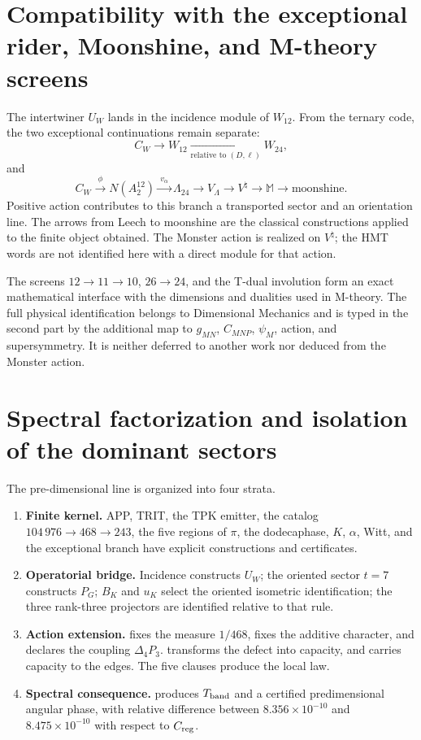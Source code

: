 \section{Compatibility with the exceptional rider, Moonshine, and M-theory screens}

The intertwiner \(U_W\) lands in the incidence module of \(W_{12}\).
From the ternary code, the two exceptional continuations remain
separate:
\[
 C_W\longrightarrow W_{12}
 \xrightarrow[\text{relative to }(D,\ell)]{}W_{24},
\]
and
\[
 C_W\xrightarrow{\ \phi\ } N(A_2^{12})
\xrightarrow{\ v_\alpha\ }\Lambda_{24}
\longrightarrow V_\Lambda
\longrightarrow V^\natural
\longrightarrow\mathbb M
\longrightarrow\text{moonshine}.
\]
Positive action contributes to this branch a transported sector and an
orientation line. The arrows from Leech to moonshine are the classical
constructions applied to the finite object obtained. The Monster action is
realized on \(V^\natural\); the HMT words are not identified here with a
direct module for that action.

The screens \(12\to11\to10\), \(26\to24\), and the T-dual involution form
an exact mathematical interface with the dimensions and dualities used in
M-theory. The full physical identification belongs to Dimensional Mechanics
and is typed in the second part by the additional map to
\(g_{MN}\), \(C_{MNP}\), \(\psi_M\), action, and supersymmetry. It is neither
deferred to another work nor deduced from the Monster action.

\section{Spectral factorization and isolation of the dominant sectors}

The pre-dimensional line is organized into four strata.
\begin{enumerate}
  \item \textbf{Finite kernel.} APP, TRIT, the TPK emitter, the catalog
  \(104\,976\to468\to243\), the five regions of \(\pi\), the
  dodecaphase, \(K\), \(\alpha\), Witt, and the exceptional branch have
  explicit constructions and certificates.
  \item \textbf{Operatorial bridge.} Incidence constructs \(U_W\);
the oriented sector \(t=7\) constructs \(P_G\); \(B_K\) and \(u_K\) select
the oriented isometric identification; the three rank-three projectors
are identified relative to that rule.
  \item \textbf{Action extension.}
\HTr fixes the measure \(1/468\), \HAdd fixes the additive
character, and \HDef declares the coupling \(\Delta_4P_3\).
\HRes transforms the defect into capacity, and \HLoc carries
capacity to the edges. The five clauses produce the local law.
  \item \textbf{Spectral consequence.} \Gtr produces
  \(T_{\rm band}\) and a certified predimensional angular phase, with
  relative difference between \(8.356\times10^{-10}\) and
  \(8.475\times10^{-10}\) with respect to \(C_{\rm reg}\).
\end{enumerate}

